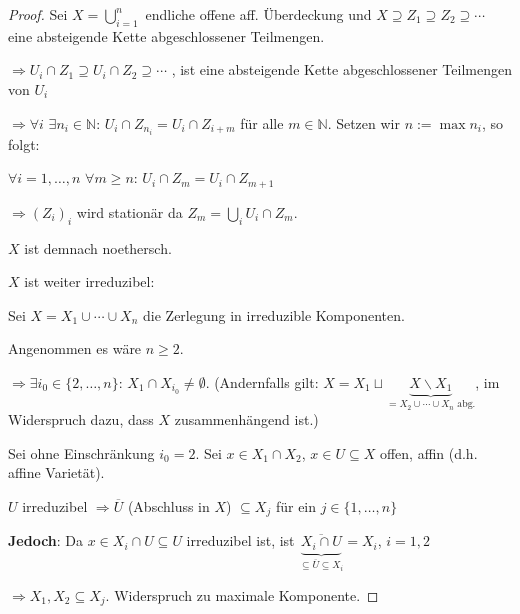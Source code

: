 \begin{proof}
  Sei $X=\bigcup_{i=1}^{n}$ endliche offene aff. Überdeckung und $X\supseteq Z_{1}\supseteq Z_{2}\supseteq\cdots$
  eine absteigende Kette abgeschlossener Teilmengen.

  $\Rightarrow U_{i}\cap Z_{1}\supseteq U_{i}\cap Z_{2}\supseteq\cdots$
  , ist eine absteigende Kette abgeschlossener Teilmengen von $U_{i}$

  $\Rightarrow\forall i$ $\exists n_{i} \in \mathbb{N}$: $U_{i}\cap Z_{n_{i}}=U_{i}\cap Z_{i+m}$ für alle $m \in \mathbb{N}$.
  Setzen wir $n:=\max n_{i}$, so folgt:

  $\forall i=1,\ldots,n$ $\forall m\geq n$: $U_{i}\cap Z_{m}=U_{i}\cap Z_{m+1}$

  $\Rightarrow(Z_{i})_{i}$ wird stationär da $Z_{m}=\bigcup_{i} U_{i}\cap Z_{m}$.

  $X$ ist demnach noethersch.

  $X$ ist weiter irreduzibel:

  Sei $X=X_{1}\cup\cdots\cup X_{n}$ die Zerlegung in irreduzible Komponenten.

  Angenommen es wäre $n\geq2$.

  $\Rightarrow\exists i_{0}\in\{2,\ldots,n\}$: $X_{1}\cap X_{i_{0}}\neq\emptyset$.
  (Andernfalls gilt: $X=X_{1}\sqcup\underbrace{X\backslash X_{1}}_{=X_{2}\cup\cdots\cup X_{n}\text{ abg.}}$, im Widerspruch dazu, dass $X$ zusammenhängend ist.)

  Sei ohne Einschränkung $i_{0}=2$. Sei $x\in X_{1}\cap X_{2}$, $x\in U\subseteq X$ offen, affin (d.h. affine Varietät).

  $U$ irreduzibel $\Rightarrow\overline{U}$ (Abschluss in $X$) $\subseteq X_{j}$
  für ein $j\in\{1,\ldots,n\}$

  \textbf{Jedoch}: Da $x\in X_{i}\cap U\subseteq U$ irreduzibel ist, ist $\underbrace{\overline{X_{i}\cap U}}_{\subseteq\overline{U}\subseteq X_{i}}=X_{i}$,
  $i=1,2$

  $\Rightarrow X_{1},X_{2}\subseteq X_{j}$. Widerspruch zu maximale
  Komponente.
\end{proof}

